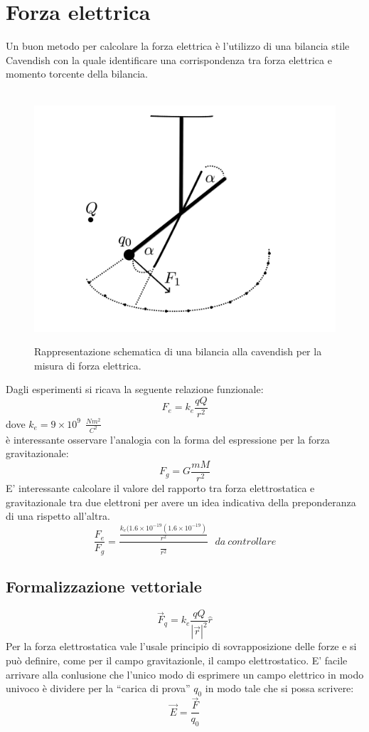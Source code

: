 \documentclass[11pt]{article}
\begin{document}
\section{Forza elettrica}
Un buon metodo per calcolare la forza elettrica è l'utilizzo di una bilancia stile Cavendish con la quale identificare una corrispondenza tra forza elettrica e momento torcente della bilancia.
\begin{center}
\begin{figure}[H]
			  \vspace{-10pt}
              \hspace{-90pt}
              ~~~~~~~~~~~~~~~~~~~~~~~~~~~~~~~~~ \includegraphics[scale=0.22]{cavendish}
               \caption{\small{Rappresentazione schematica di una bilancia alla cavendish per la misura di forza elettrica.}}
               \end{figure} 
               \end{center}
Dagli esperimenti si ricava la seguente relazione funzionale:
$$F_e=k_e\frac{qQ}{r^2}$$
dove $k_e=9\times10^9~~\frac{Nm^2}{C^2}$
\\è interessante osservare l'analogia con la forma del espressione per la forza gravitazionale:
$$F_g=G\frac{mM}{r^2}$$
E' interessante calcolare il valore del rapporto tra forza elettrostatica e gravitazionale tra due elettroni per avere un idea indicativa della preponderanza di una rispetto all'altra.
$$\frac{F_e}{F_g}=\frac{\frac{k_e(1.6\times10^{-19}(1.6\times10^{-19})}{r^2}}{\frac{}{r^2}}~~~da~controllare$$
\subsection{Formalizzazione vettoriale}
$$\overrightarrow{F}_q=k_e\frac{qQ}{|\overrightarrow{r}|^2}\hat{r}$$
Per la forza elettrostatica vale l'usale principio di sovrapposizione delle forze e si può definire, come per il campo gravitazionle, il campo elettrostatico.
E' facile arrivare alla conlusione che l'unico modo di esprimere un campo elettrico in modo univoco è dividere per la ``carica di prova'' $q_0$ in modo tale che si possa scrivere:
$$\overrightarrow{E}=\frac{\overrightarrow{F}}{q_0}$$
\end{document}
